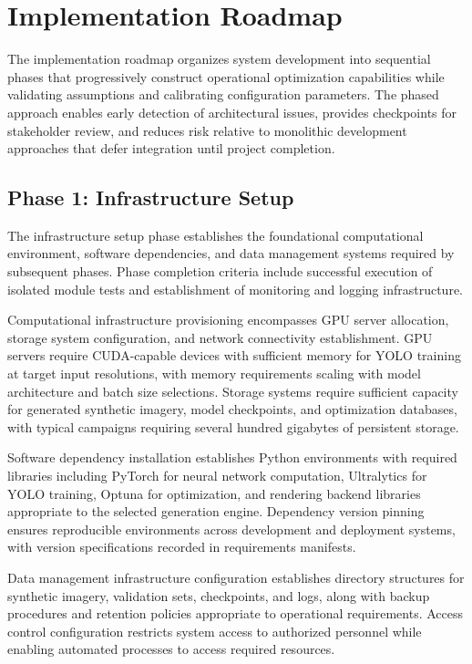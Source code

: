 \section{Implementation Roadmap}
\label{sec:implementation_roadmap}

The implementation roadmap organizes system development into sequential phases that progressively construct operational optimization capabilities while validating assumptions and calibrating configuration parameters. The phased approach enables early detection of architectural issues, provides checkpoints for stakeholder review, and reduces risk relative to monolithic development approaches that defer integration until project completion.

\subsection{Phase 1: Infrastructure Setup}

The infrastructure setup phase establishes the foundational computational environment, software dependencies, and data management systems required by subsequent phases. Phase completion criteria include successful execution of isolated module tests and establishment of monitoring and logging infrastructure.

Computational infrastructure provisioning encompasses GPU server allocation, storage system configuration, and network connectivity establishment. GPU servers require CUDA-capable devices with sufficient memory for YOLO training at target input resolutions, with memory requirements scaling with model architecture and batch size selections. Storage systems require sufficient capacity for generated synthetic imagery, model checkpoints, and optimization databases, with typical campaigns requiring several hundred gigabytes of persistent storage.

Software dependency installation establishes Python environments with required libraries including PyTorch for neural network computation, Ultralytics for YOLO training, Optuna for optimization, and rendering backend libraries appropriate to the selected generation engine. Dependency version pinning ensures reproducible environments across development and deployment systems, with version specifications recorded in requirements manifests.

Data management infrastructure configuration establishes directory structures for synthetic imagery, validation sets, checkpoints, and logs, along with backup procedures and retention policies appropriate to operational requirements. Access control configuration restricts system access to authorized personnel while enabling automated processes to access required resources.

